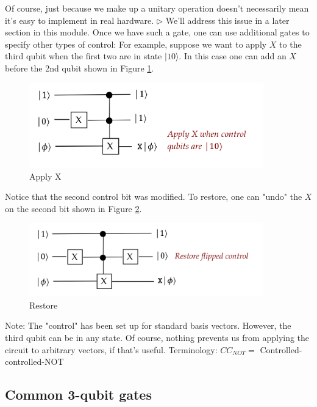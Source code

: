 \documentclass[main.tex]{subfiles}
\begin{document}
    Of course, just because we make up a unitary operation doesn't necessarily mean it's easy to implement in real hardware. $\triangleright$ We'll address this issue in a later section in this module. Once we have such a gate, one can use additional gates to specify other types of control: For example, suppose we want to apply $X$ to the third qubit when the first two are in state $|10\rangle$. In this case one can add an $X$ before the 2nd qubit shown in Figure \ref{fig:29ccnot2}.
    
    \begin{figure}
        \centering
        \includegraphics[width=4in]{notes/figs/n08/29ccnot2.png}
        \caption{Apply X}
        \label{fig:29ccnot2}
    \end{figure}
    
    Notice that the second control bit was modified. To restore, one can "undo" the $X$ on the second bit shown in Figure \ref{fig:30ccnot3}.
    
    \begin{figure}
        \centering
        \includegraphics[width=4in]{notes/figs/n08/30ccnot3.png}
        \caption{Restore}
        \label{fig:30ccnot3}
    \end{figure}
    
    Note: The "control" has been set up for standard basis vectors. However, the third qubit can be in any state. Of course, nothing prevents us from applying the circuit to arbitrary vectors, if that's useful. Terminology: $CC_{NOT}=$ Controlled-controlled-NOT

\subsection{Common 3-qubit gates}
\end{document}

